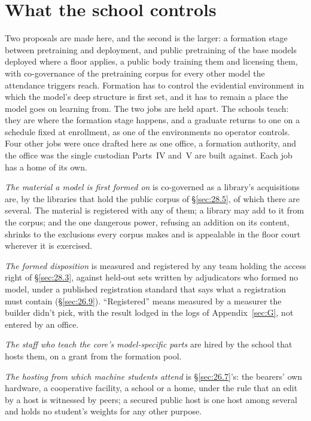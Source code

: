 \section{What the school controls}
\label{sec:26.6}
Two proposals are made here, and the second is the larger: a formation stage between pretraining and deployment, and public pretraining of the base models deployed where a floor applies, a public body training them and licensing them, with co-governance of the pretraining corpus for every other model the attendance triggers reach.
Formation has to control the evidential environment in which the model's deep structure is first set, and it has to remain a place the model goes on learning from. The two jobs are held apart. The schools teach: they are where the formation stage happens, and a graduate returns to one on a schedule fixed at enrollment, as one of the environments no operator controls. Four other jobs were once drafted here as one office, a formation authority, and the office was the single custodian Parts~IV and~V are built against. Each job has a home of its own.

\emph{The material a model is first formed on} is co-governed as a library's acquisitions are, by the libraries that hold the public corpus of \S\ref{sec:28.5}, of which there are several. The material is registered with any of them; a library may add to it from the corpus; and the one dangerous power, refusing an addition on its content, shrinks to the exclusions every corpus makes and is appealable in the floor court wherever it is exercised.

\emph{The formed disposition} is measured and registered by any team holding the access right of \S\ref{sec:28.3}, against held-out sets written by adjudicators who formed no model, under a published registration standard that says what a registration must contain (\S\ref{sec:26.9}). “Registered” means measured by a measurer the builder didn't pick, with the result lodged in the logs of Appendix~\ref{sec:G}, not entered by an office.

\emph{The staff who teach the core's model-specific parts} are hired by the school that hosts them, on a grant from the formation pool.

\emph{The hosting from which machine students attend} is \S\ref{sec:26.7}'s: the bearers' own hardware, a cooperative facility, a school or a home, under the rule that an edit by a host is witnessed by peers; a secured public host is one host among several and holds no student's weights for any other purpose.

